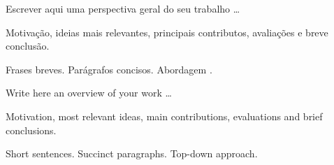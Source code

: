 




Escrever aqui uma perspectiva geral do seu trabalho \ldots

Motivação, ideias mais relevantes, principais contributos, avaliações e breve conclusão.

Frases breves. Parágrafos concisos. Abordagem .






Write here an overview of your work \ldots

Motivation, most relevant ideas, main contributions, evaluations and brief conclusions.

Short sentences. Succinct paragraphs. Top-down approach.